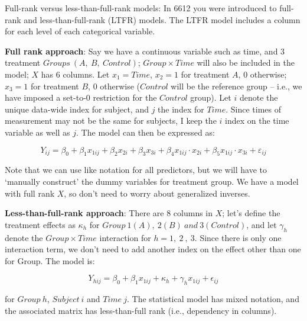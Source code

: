 \documentclass[
  9pt,
  ignorenonframetext,
]{beamer}
\begin{document}
\begin{frame}{Full-rank versus less-than-full-rank models:}
\protect\hypertarget{full-rank-versus-less-than-full-rank-models}{}
In 6612 you were introduced to full-rank and less-than-full-rank (LTFR)
models. The LTFR model includes a column for each level of each
categorical variable.

\textbf{Full rank approach}: Say we have a continuous variable such as
time, and 3 treatment \(Groups\ (A,\ B,\ Control)\);
\(Group \times Time\) will also be included in the model; \(X\) has 6
columns. Let \(x_1 = Time\), \(x_2=1\) for treatment \(A\), 0 otherwise;
\(x_3=1\) for treatment \(B\), 0 otherwise (\(Control\) will be the
reference group -- i.e., we have imposed a set-to-0 restriction for the
\(Control\) group). Let \(i\) denote the unique data-wide index for
subject, and \(j\) the index for \(Time\). Since times of measurement
may not be the same for subjects, I keep the \(i\) index on the time
variable as well as \(j\). The model can then be expressed as:

\[
Y_{ij} = \beta_0 + \beta_1 x_{1ij} + \beta_2 x_{2i} + 
\beta_3 x_{3i} + \beta_4 x_{1ij} \cdot x_{2i} + \beta_5 x_{1ij} \cdot x_{3i} + ε_{ij}
\]

Note that we can use like notation for all predictors, but we will have
to `manually construct' the dummy variables for treatment group. We have
a model with full rank \(X\), so don't need to worry about generalized
inverses.
\end{frame}

\begin{frame}{}
\protect\hypertarget{section}{}
\textbf{Less-than-full-rank approach}: There are 8 columns in \(X\);
let's define the treatment effects as \(\kappa_h\) for
\(Group\ 1 (A),\ 2 (B)\ and\ 3 (Control)\), and let \(\gamma_h\) denote
the \(Group \times Time\) interaction for \(h=1,\ 2\ ,\ 3\). Since there
is only one interaction term, we don't need to add another index on the
effect other than one for Group. The model is:

\[
Y_{hij} = \beta_0 + \beta_1 x_{1ij} + \kappa_h + \gamma_h x_{1ij} + \epsilon_{ij}
\]

for \(Group\ h\), \(Subject\ i\) and \(Time\ j\). The statistical model
has mixed notation, and the associated matrix has less-than-full rank
(i.e., dependency in columns).
\end{frame}
\end{document}
